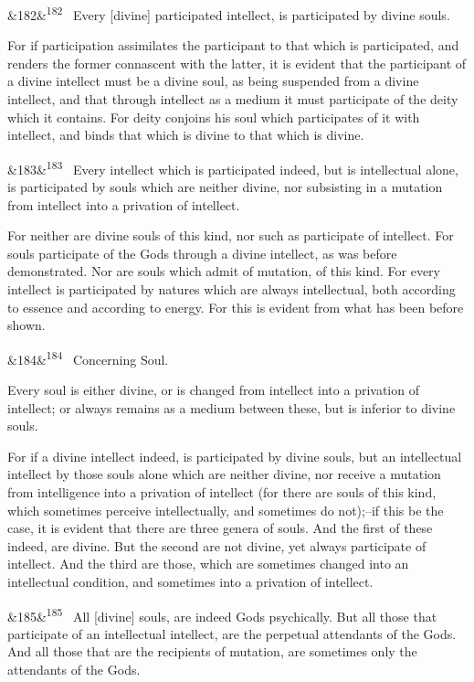 \documentclass[12pt]{article}
\newcommand{\para}[1][]{\par\noindent\ifx&#1&\else\textsuperscript{\footnotesize #1}~\fi}
\begin{document}
\para[182] Every [divine] participated intellect, is participated by divine souls.

For if participation assimilates the participant to that which is participated, and renders the former connascent with the latter, it is evident that the participant of a divine intellect must be a divine soul, as being suspended from a divine intellect, and that through intellect as a medium it must participate of the deity which it contains. For deity conjoins his soul which participates of it with intellect, and binds that which is divine to that which is divine.

\para[183] Every intellect which is participated indeed, but is intellectual alone, is participated by souls which are neither divine, nor subsisting in a mutation from intellect into a privation of intellect.

For neither are divine souls of this kind, nor such as participate of intellect. For souls participate of the Gods through a divine intellect, as was before demonstrated. Nor are souls which admit of mutation, of this kind. For every intellect is participated by natures which are always intellectual, both according to essence and according to energy. For this is evident from what has been before shown.

\para[184] Concerning Soul.

Every soul is either divine, or is changed from intellect into a privation of intellect; or always remains as a medium between these, but is inferior to divine souls.

For if a divine intellect indeed, is participated by divine souls, but an intellectual intellect by those souls alone which are neither divine, nor receive a mutation from intelligence into a privation of intellect (for there are souls of this kind, which sometimes perceive intellectually, and sometimes do not);--if this be the case, it is evident that there are three genera of souls. And the first of these indeed, are divine. But the second are not divine, yet always participate of intellect. And the third are those, which are sometimes changed into an intellectual condition, and sometimes into a privation of intellect.

\para[185] All [divine] souls, are indeed Gods psychically. But all those that participate of an intellectual intellect, are the perpetual attendants of the Gods. And all those that are the recipients of mutation, are sometimes only the attendants of the Gods.
\end{document}
